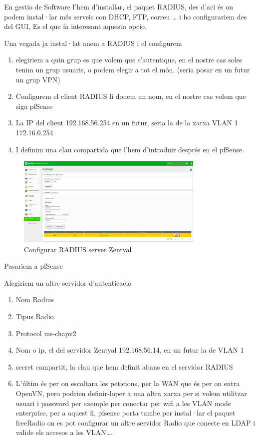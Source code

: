 \documentclass[
  10pt,
]{krantz}
\providecommand{\tightlist}{%
  \setlength{\itemsep}{0pt}\setlength{\parskip}{0pt}}
\begin{document}
En gestio de Software l'hem d'installar, el paquet RADIUS, des d'aci és on podem instal·lar més serveis con DHCP, FTP, correu \ldots{} i ho configurariem des del GUI, Es el que fa interesant aquesta opcio.

Una vegada ja instal·lat anem a RADIUS i el configurem

\begin{enumerate}
\def\labelenumi{\arabic{enumi}.}
\tightlist
\item
  elegiriem a quin grup es que volem que s'autentique, en el nostre cas soles tenim un grup usuaris, o podem elegir a tot el món. (seria posar en un futur un grup VPN)
\item
  Configurem el client RADIUS li donem un nom, en el nostre cas volem que siga pfSense
\item
  La IP del client 192.168.56.254 en un futur, seria la de la xarxa VLAN 1 172.16.0.254
\item
  I definim una clau compartida que l'hem d'introduir després en el pfSense.
\end{enumerate}

\begin{figure}
\centering
\includegraphics[width=0.8\textwidth,height=\textheight]{imatges/proxmox/Radius_server.png}
\caption{Configurar RADIUS server Zentyal}
\end{figure}

Pasariem a pfSense

Afegiriem un altre servidor d'autenticacio

\begin{enumerate}
\def\labelenumi{\arabic{enumi}.}
\tightlist
\item
  Nom Radius
\item
  Tipus Radio
\item
  Protocol ms-chapv2
\item
  Nom o ip, el del servidor Zentyal 192.168.56.14, en un futur la de VLAN 1
\item
  secret compartit, la clau que hem definit abans en el servidor RADIUS
\item
  L'últim és per on escoltara les peticions, per la WAN que és per on entra OpenVN, pero podrien definir-loper a una altra xarxa per si volem utilitzar usuari i password per exemple per conectar per wifi a les VLAN mode enterprise, per a aquest fi, pfsense porta tambe per instal·lar el paquet freeRadio on es pot configurar un altre servidor Radio que conecte en LDAP i valide els accesos a les VLAN\ldots.
\end{enumerate}
\end{document}
